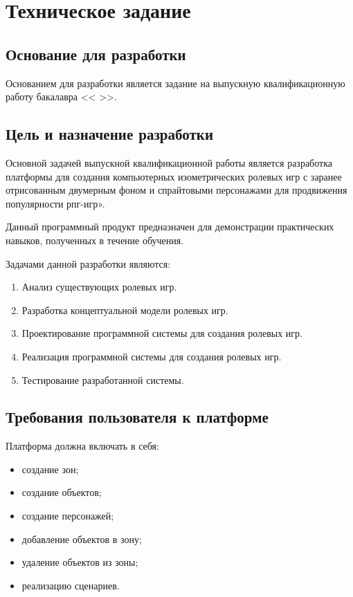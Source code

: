 \section{Техническое задание}
\subsection{Основание для разработки}

Основанием для разработки является задание на выпускную квалификационную работу бакалавра << >>.

\subsection{Цель и назначение разработки}

Основной задачей выпускной квалификационной работы является разработка платформы для создания компьютерных изометрических ролевых игр с заранее отрисованным двумерным фоном и спрайтовыми персонажами для продвижения популярности рпг-игр».

Данный программный продукт предназначен для демонстрации практических навыков, полученных в течение обучения.

Задачами данной разработки являются:
\begin{enumerate}
\item Анализ существующих ролевых игр.
\item Разработка концептуальной модели ролевых игр.
\item Проектирование программной системы для создания ролевых игр.
\item Реализация программной системы для создания ролевых игр.
\item Тестирование разработанной системы.
\end{enumerate}

\subsection{Требования пользователя к платформе}

Платформа должна включать в себя:
\begin{itemize}
    \item создание зон;
    \item создание объектов;
    \item создание персонажей;
    \item добавление объектов в зону;
    \item удаление объектов из зоны;
    \item реализацию сценариев.
\end{itemize}

